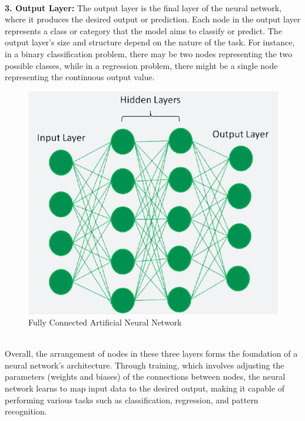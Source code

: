 \\
\textbf{3. Output Layer:} The output layer is the final layer of the neural network, where it produces the desired output or prediction. Each node in the output layer represents a class or category that the model aims to classify or predict. The output layer's size and structure depend on the nature of the task. For instance, in a binary classification problem, there may be two nodes representing the two possible classes, while in a regression problem, there might be a single node representing the continuous output value.
\\
 \begin{figure}[hbt!]
  \centering
 \includegraphics[width=0.8\linewidth]{C_chap/fig28.png}
     \caption{Fully Connected Artificial Neural Network }
\end{figure}
\\
Overall, the arrangement of nodes in these three layers forms the foundation of a neural network's architecture. Through training, which involves adjusting the parameters (weights and biases) of the connections between nodes, the neural network learns to map input data to the desired output, making it capable of performing various tasks such as classification, regression, and pattern recognition.
